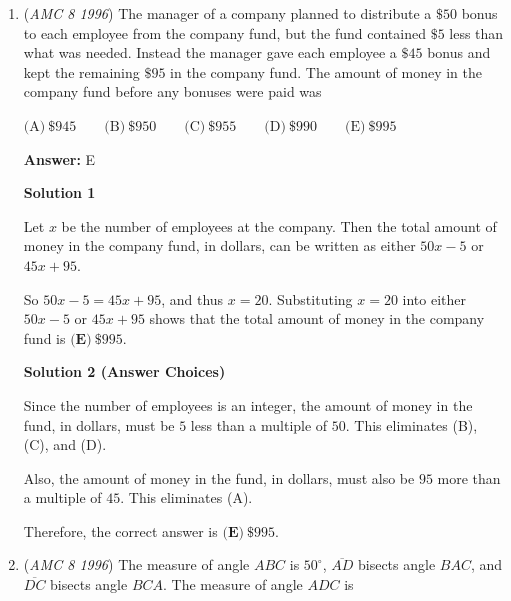 \begin{enumerate}
 



\textbf{Solution 4}

Using the Pythagorean Theorem, we know $BC$ is $\sqrt{2}$. Using $BC$ as a base of the triangle, the height is $\frac{1}{2}\sqrt{2}$. The area would be $\frac{1}{2}\cdot\frac{1}{2}\sqrt{2}\cdot\sqrt{2}$, which equals $\frac{1}{2}$, so the answer is $\boxed{B}$.

 


	\item (\textit{AMC 8 1996}) The manager of a company planned to distribute a $\$50$ bonus to each employee from the company fund, but the fund contained $\$5$ less than what was needed.  Instead the manager gave each employee a $\$45$ bonus and kept the remaining $\$95$ in the company fund.  The amount of money in the company fund before any bonuses were paid was


 $\text{(A)}\ \$945 \qquad \text{(B)}\ \$950 \qquad \text{(C)}\ \$955 \qquad \text{(D)}\ \$990 \qquad \text{(E)}\ \$995$

 \textbf{Answer: }E



\textbf{Solution 1}

Let $x$ be the number of employees at the company.  Then the total amount of money in the company fund, in dollars, can be written as either $50x-5$ or $45x+95$.  

 So $50x - 5 = 45x + 95$, and thus $x = 20$.  Substituting $x = 20$ into either $50x-5$ or $45x+95$ shows that the total amount of money in the company fund is $\boxed{\textbf{(E)}\ \$995}$.

 



\textbf{Solution 2 (Answer Choices)}

Since the number of employees is an integer, the amount of money in the fund, in dollars, must be $5$ less than a multiple of $50$.  This eliminates (B), (C), and (D).

 Also, the amount of money in the fund, in dollars, must also be $95$ more than a multiple of $45$.  This eliminates (A).

 Therefore, the correct answer is $\boxed{\textbf{(E)}\ \$995}$.

 


	\item (\textit{AMC 8 1996}) The measure of angle $ABC$ is $50^\circ$, $\overline{AD}$ bisects angle $BAC$, and $\overline{DC}$ bisects angle $BCA$.  The measure of angle $ADC$ is



\end{enumerate}
